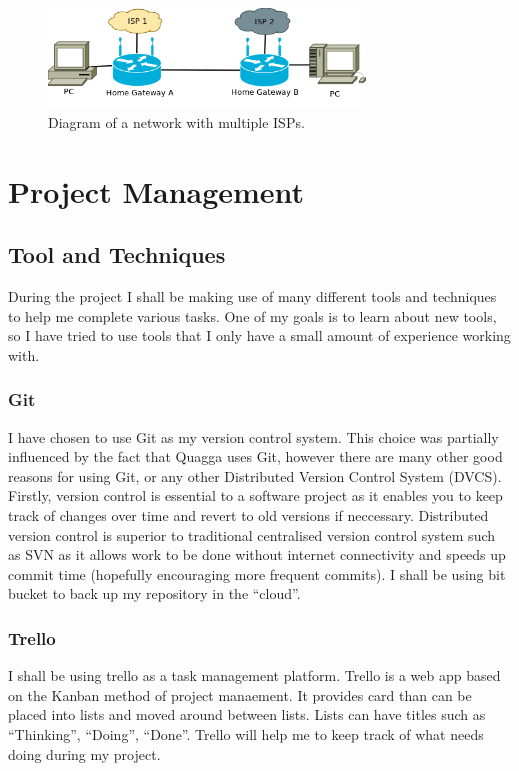 \documentclass[12pt]{report}
\begin{document}
\begin{figure}
\centering
\includegraphics[width=0.75\textwidth]{../Diagrams/Network/MultipleISP.png}
\caption{Diagram of a network with multiple ISPs.}
\label{fig:ComplexTestNet}
\end{figure}

\chapter{Project Management}

\section{Tool and Techniques}

During the project I shall be making use of many different tools and techniques
to help me complete various tasks. One of my goals is to learn about new tools,
so I have tried to use tools that I only have a small amount of experience
working with. 

\subsection{Git}
I have chosen to use Git as my version control system. This choice was
partially influenced by the fact that Quagga uses Git, however there are many
other good reasons for using Git, or any other Distributed Version Control
System (DVCS). Firstly, version control is essential to a software project as
it enables you to keep track of changes over time and revert to old versions if
neccessary. Distributed version control is superior to traditional centralised 
version control system such as SVN as it allows work to be done without internet
connectivity and speeds up commit time (hopefully encouraging more frequent
commits). I shall be using bit bucket to back up my repository in the ``cloud''.

\subsection{Trello}
I shall be using trello as a task management platform. Trello is a web app based 
on the Kanban method of project manaement. It provides card than can be placed
into lists and moved around between lists. Lists can have titles such as
``Thinking'', ``Doing'', ``Done''. Trello will help me to keep track of what
needs doing during my project.
\end{document}
